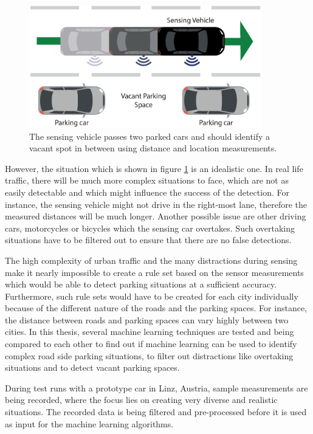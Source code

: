 \begin{figure}
	\centering
	\includegraphics[width=0.9\textwidth]{img/drive-by-parking-situation-pictogram.eps}
	\caption{The sensing vehicle passes two parked cars and should identify a vacant spot in between using distance and location measurements. }
	\label{fig:driveby_standard_parking_situation}
\end{figure}

However, the situation which is shown in figure \ref{fig:driveby_standard_parking_situation} is an idealistic one. In real life traffic, there will be much more complex situations to face, which are not as easily detectable and which might influence the success of the detection. For instance, the sensing vehicle might not drive in the right-most lane, therefore the measured distances will be much longer. Another possible issue are other driving cars, motorcycles or bicycles which the sensing car overtakes. Such overtaking  situations have to be filtered out to ensure that there are no false detections. 

The high complexity of urban traffic and the many distractions during sensing make it nearly impossible to create a rule set based on the sensor measurements which would be able to detect parking situations at a sufficient accuracy. Furthermore, such rule sets would have to be created for each city individually because of the different nature of the roads and the parking spaces. For instance, the distance between roads and parking spaces can vary highly between two cities.
In this thesis, several machine learning techniques are tested and being compared to each other to find out if machine learning can be used to identify complex road side parking situations, to filter out distractions like overtaking situations and to detect vacant parking spaces. 

During test runs with a prototype car in Linz, Austria, sample measurements are being recorded, where the focus lies on creating very diverse and realistic situations. The recorded data is being filtered and pre-processed before it is used as input for the machine learning algorithms. 






